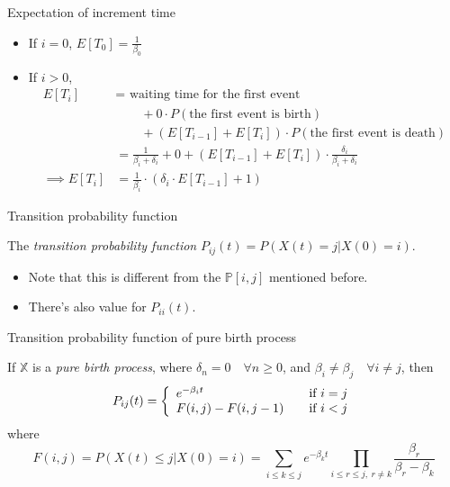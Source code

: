 \documentclass[mathserif]{beamer}
\begin{document}
\begin{frame}{Expectation of increment time}
\begin{itemize}
\item If $i = 0$, $\displaystyle{E[T_0] = \frac{1}{\beta_0}}$
\item If $i > 0$,
\begin{align*}
E[T_i] & = \text{ waiting time for the first event} \\
& \qquad + 0 \cdot P(\text{the first event is birth}) \\
& \qquad + (E[T_{i-1}] + E[T_i])\cdot P(\text{the first event is death}) \\
& = \frac{1}{\beta_i + \delta_i} + 0 + (E[T_{i-1}] + E[T_i])\cdot \frac{\delta_i}{\beta_i + \delta_i} \\
\implies E[T_i] & = \frac{1}{\beta_i}\cdot (\delta_i\cdot E[T_{i-1}] + 1)
\end{align*}
\end{itemize}
\end{frame}

\begin{frame}{Transition probability function}
\begin{definition}
The \emph{transition probability function} $P_{ij}(t) = P(X(t) = j | X(0) = i)$.
\end{definition}
\begin{itemize}
\item Note that this is different from the $\mathbb{P}[i,j]$ mentioned before.
\item There's also value for $P_{ii}(t)$.
\end{itemize}
\end{frame}

\begin{frame}{Transition probability function of pure birth process}\label{pure_birth}
\begin{theorem}
If $\mathbb{X}$ is a \emph{pure birth process}, where $\delta_n = 0 \quad\forall n\geq 0$, 
and $\beta_i\neq \beta_j \quad\forall i\neq j$, then
\[
P_{ij}(t) = \left\{
\begin{array}{l l}
e^{-\beta_i t} & \quad\text{if } i = j \\
F(i,j) - F(i,j-1) & \quad\text{if } i < j \\
\end{array}
\right.
\]
where
\[
F(i,j) = P(X(t)\leq j | X(0) = i) = \sum_{i\leq k\leq j} e^{-\beta_k t} 
\prod_{i\leq r\leq j,~ r\neq k}\frac{\beta_r}{\beta_r - \beta_k}
\]
\end{theorem}
\end{frame}
\end{document}
